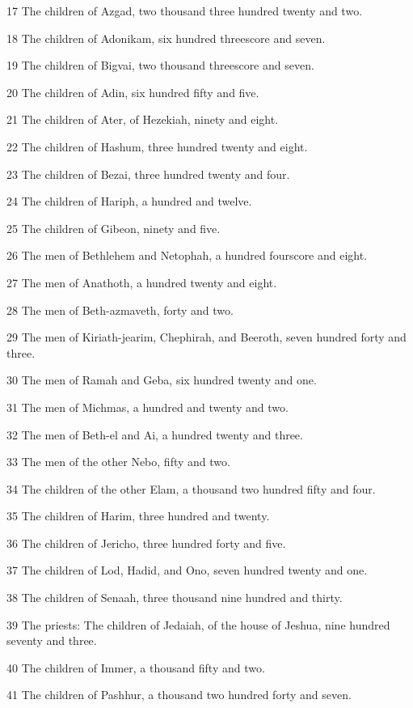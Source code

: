 \par 17 The children of Azgad, two thousand three hundred twenty and two.
\par 18 The children of Adonikam, six hundred threescore and seven.
\par 19 The children of Bigvai, two thousand threescore and seven.
\par 20 The children of Adin, six hundred fifty and five.
\par 21 The children of Ater, of Hezekiah, ninety and eight.
\par 22 The children of Hashum, three hundred twenty and eight.
\par 23 The children of Bezai, three hundred twenty and four.
\par 24 The children of Hariph, a hundred and twelve.
\par 25 The children of Gibeon, ninety and five.
\par 26 The men of Bethlehem and Netophah, a hundred fourscore and eight.
\par 27 The men of Anathoth, a hundred twenty and eight.
\par 28 The men of Beth-azmaveth, forty and two.
\par 29 The men of Kiriath-jearim, Chephirah, and Beeroth, seven hundred forty and three.
\par 30 The men of Ramah and Geba, six hundred twenty and one.
\par 31 The men of Michmas, a hundred and twenty and two.
\par 32 The men of Beth-el and Ai, a hundred twenty and three.
\par 33 The men of the other Nebo, fifty and two.
\par 34 The children of the other Elam, a thousand two hundred fifty and four.
\par 35 The children of Harim, three hundred and twenty.
\par 36 The children of Jericho, three hundred forty and five.
\par 37 The children of Lod, Hadid, and Ono, seven hundred twenty and one.
\par 38 The children of Senaah, three thousand nine hundred and thirty.
\par 39 The priests: The children of Jedaiah, of the house of Jeshua, nine hundred seventy and three.
\par 40 The children of Immer, a thousand fifty and two.
\par 41 The children of Pashhur, a thousand two hundred forty and seven.
